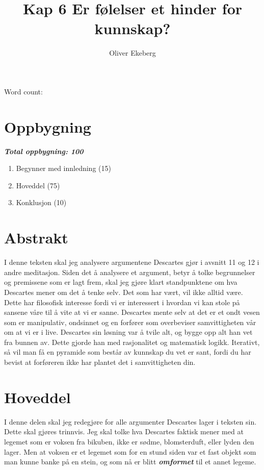 \documentclass[11pt, a4paper]{article}
\title{Kap 6 Er følelser et hinder for kunnskap?}
\author{Oliver Ekeberg}
\date{}
\begin{document}
\maketitle

Word count:

\tableofcontents


\section{Oppbygning}

\textbf{\textit{Total oppbygning: 100}}

\begin{enumerate}
    \item Begynner med innledning (15)
    \item Hoveddel (75)
    \item Konklusjon (10)
\end{enumerate}

\section{Abstrakt}

I denne teksten skal jeg analysere argumentene Descartes gjør i avsnitt 11 og 12 i andre meditasjon. 
Siden det å analysere et argument, betyr å tolke begrunnelser og premissene som er lagt frem, skal jeg gjøre klart standpunktene om hva Descartes mener om det å tenke selv. Det 
som har vært, vil ikke alltid være. Dette har filosofisk interesse fordi vi er interessert i hvordan vi kan stole på sansene våre til å vite at vi er sanne. Descartes mente selv at det er et ondt vesen som er manipulativ, ondsinnet og en forfører som overbeviser samvittigheten vår om at vi er i live.
Descartes sin løsning var å tvile alt, og bygge opp alt han vet fra bunnen av. Dette gjorde han med rasjonalitet og matematisk logikk. Iterativt, så vil man få en pyramide som består av kunnskap du vet er sant, fordi du har bevist at forføreren ikke har plantet det i samvittigheten din.





\section{Hoveddel}

I denne delen skal jeg redegjøre for alle argumenter Descartes lager i teksten sin. Dette skal gjøres trinnvis.  
Jeg skal tolke hva Descartes faktisk mener med at legemet som er voksen fra bikuben, ikke er 
sødme, blomsterduft, eller lyden den lager. Men at voksen er et legemet som for en stund siden var et fast objekt 
som man kunne banke på en stein, og som nå er blitt \textbf{\textit{omformet}} til et annet legeme.
\end{document}
